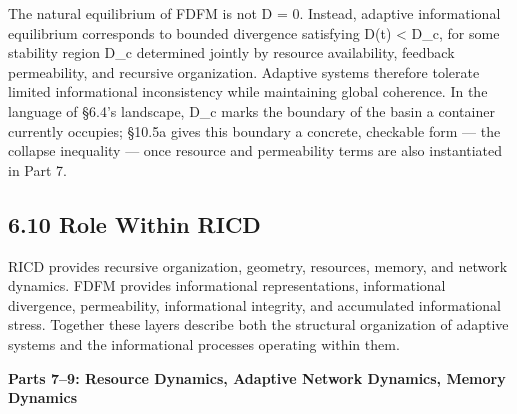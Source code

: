 \documentclass[
]{article}
\begin{document}
The natural equilibrium of FDFM is not D = 0. Instead, adaptive
informational equilibrium corresponds to bounded divergence satisfying
D(t) \textless{} D\_c, for some stability region D\_c determined jointly
by resource availability, feedback permeability, and recursive
organization. Adaptive systems therefore tolerate limited informational
inconsistency while maintaining global coherence. In the language of
§6.4's landscape, D\_c marks the boundary of the basin a container
currently occupies; §10.5a gives this boundary a concrete, checkable
form --- the collapse inequality --- once resource and permeability
terms are also instantiated in Part 7.

\hypertarget{role-within-ricd}{%
\subsection{6.10 Role Within RICD}\label{role-within-ricd}}

RICD provides recursive organization, geometry, resources, memory, and
network dynamics. FDFM provides informational representations,
informational divergence, permeability, informational integrity, and
accumulated informational stress. Together these layers describe both
the structural organization of adaptive systems and the informational
processes operating within them.

\textbf{Parts 7--9: Resource Dynamics, Adaptive Network Dynamics, Memory
Dynamics}
\end{document}
